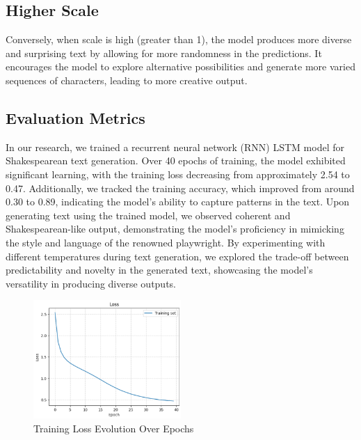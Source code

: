 \documentclass[conference]{IEEEtran}
\begin{document}
\subsection*{Higher Scale}
Conversely, when scale is high (greater than 1), the model produces more diverse and surprising text by allowing for more randomness in the predictions. It encourages the model to explore alternative possibilities and generate more varied sequences of characters, leading to more creative output.





\subsection{Evaluation Metrics}
In our research, we trained a recurrent neural network (RNN) LSTM model for Shakespearean text generation. Over 40 epochs of training, the model exhibited significant learning, with the training loss decreasing from approximately 2.54 to 0.47. Additionally, we tracked the training accuracy, which improved from around 0.30 to 0.89, indicating the model's ability to capture patterns in the text. Upon generating text using the trained model, we observed coherent and Shakespearean-like output, demonstrating the model's proficiency in mimicking the style and language of the renowned playwright. By experimenting with different temperatures during text generation, we explored the trade-off between predictability and novelty in the generated text, showcasing the model's versatility in producing diverse outputs.

\begin{figure}
    \centering
    \includegraphics[width=0.5\textwidth]{NLP1.png}
    \caption{Training Loss Evolution Over Epochs}
    \label{fig:example}
\end{figure}
\end{document}
